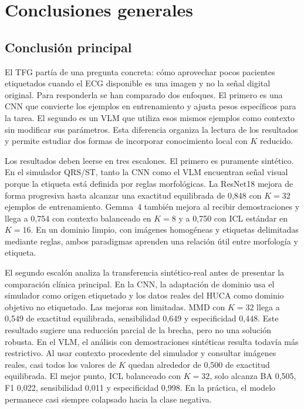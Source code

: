 \chapter{Conclusiones generales}
\label{chap:conclusiones}

\section{Conclusión principal}

El TFG partía de una pregunta concreta: cómo aprovechar pocos pacientes etiquetados cuando el ECG disponible es una imagen y no la señal digital original. Para responderla se han comparado dos enfoques. El primero es una CNN que convierte los ejemplos en entrenamiento y ajusta pesos específicos para la tarea. El segundo es un VLM que utiliza esos mismos ejemplos como contexto sin modificar sus parámetros. Esta diferencia organiza la lectura de los resultados y permite estudiar dos formas de incorporar conocimiento local con \(K\) reducido.

Los resultados deben leerse en tres escalones. El primero es puramente sintético. En el simulador QRS/ST, tanto la CNN como el VLM encuentran señal visual porque la etiqueta está definida por reglas morfológicas. La ResNet18 mejora de forma progresiva hasta alcanzar una exactitud equilibrada de 0,848 con \(K=32\) ejemplos de entrenamiento. Gemma~4 también mejora al recibir demostraciones y llega a 0,754 con contexto balanceado en \(K=8\) y a 0,750 con ICL estándar en \(K=16\). En un dominio limpio, con imágenes homogéneas y etiquetas delimitadas mediante reglas, ambos paradigmas aprenden una relación útil entre morfología y etiqueta.

El segundo escalón analiza la transferencia sintético-real antes de presentar la comparación clínica principal. En la CNN, la adaptación de dominio usa el simulador como origen etiquetado y los datos reales del HUCA como dominio objetivo no etiquetado. Las mejoras son limitadas. MMD con \(K=32\) llega a 0,549 de exactitud equilibrada, sensibilidad 0,649 y especificidad 0,448. Este resultado sugiere una reducción parcial de la brecha, pero no una solución robusta. En el VLM, el análisis con demostraciones sintéticas resulta todavía más restrictivo. Al usar contexto procedente del simulador y consultar imágenes reales, casi todos los valores de \(K\) quedan alrededor de 0,500 de exactitud equilibrada. El mejor punto, ICL balanceado con \(K=32\), solo alcanza BA 0,505, F1 0,022, sensibilidad 0,011 y especificidad 0,998. En la práctica, el modelo permanece casi siempre colapsado hacia la clase negativa.

